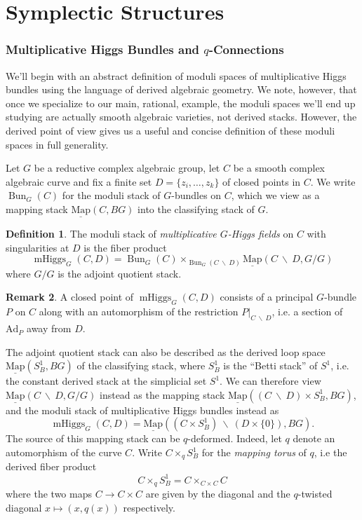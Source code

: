 \documentclass[11pt, oneside, reqno]{amsart}
\theoremstyle{definition} \newtheorem{definition}{Definition}[section]
\theoremstyle{definition} \newtheorem{remark}[definition]{Remark}
\theoremstyle{definition} \newtheorem{remarks}[definition]{Remarks}
\theoremstyle{definition} \newtheorem{question}[definition]{Question}
\theoremstyle{definition} \newtheorem*{note}{Note}
\theoremstyle{definition} \newtheorem{example}[definition]{Example}
\theoremstyle{definition} \newtheorem{examples}[definition]{Examples}
\newcommand{\mr}[1]{\mathrm{#1}}
\newcommand{\bs}{\ \backslash \ }
\newcommand{\ul}[1]{\underline{#1}}
\DeclareMathOperator{\bun}{Bun}
\DeclareMathOperator{\mhiggs}{mHiggs}
\newcommand{\map}{\ul{\mr{Map}}}
\newcommand{\Ad}{\mr{Ad}}
\begin{document}
\renewcommand{\thepart}{\Alph{part}}
\part{Symplectic Structures}

\section{Multiplicative Higgs Bundles and $q$-Connections} \label{mhiggs_def_section}
We'll begin with an abstract definition of moduli spaces of multiplicative Higgs bundles using the language of derived algebraic geometry.  We note, however, that once we specialize to our main, rational, example, the moduli spaces we'll end up studying are actually smooth algebraic varieties, not derived stacks.  However, the derived point of view gives us a useful and concise definition of these moduli spaces in full generality.

Let $G$ be a reductive complex algebraic group, let $C$ be a smooth complex algebraic curve and fix a finite set $D = \{z_i, \ldots, z_k\}$ of closed points in $C$.  We write $\bun_G(C)$ for the moduli stack of $G$-bundles on $C$, which we view as a mapping stack $\map(C, BG)$ into the classifying stack of $G$.

\begin{definition}
The moduli stack of \emph{multiplicative $G$-Higgs fields} on $C$ with singularities at $D$ is the fiber product
\[\mhiggs_G(C,D) = \bun_G(C) \times_{\bun_G(C \! \bs \! D)} \map(C \! \bs \! D, G/G)\]
where $G/G$ is the adjoint quotient stack.
\end{definition}

\begin{remark}
A closed point of $\mhiggs_G(C,D)$ consists of a principal $G$-bundle $P$ on $C$ along with an automorphism of the restriction $P|_{C \! \bs \! D}$, i.e. a section of $\Ad_P$ away from $D$.
\end{remark}

The adjoint quotient stack can also be described as the derived loop space $\map(S^1_B, BG)$ of the classifying stack, where $S^1_B$ is the ``Betti stack'' of $S^1$, i.e. the constant derived stack at the simplicial set $S^1$.  We can therefore view $\map(C \! \bs \! D, G/G)$ instead as the mapping stack $\map((C \! \bs \! D) \times S^1_B, BG)$, and the moduli stack of multiplicative Higgs bundles instead as
\[\mhiggs_G(C,D) = \map((C \times S^1_B) \bs (D \times \{0\}), BG).\]  
The source of this mapping stack can be $q$-deformed.  Indeed, let $q$ denote an automorphism of the curve $C$.  Write $C \times_q S^1_B$ for the \emph{mapping torus} of $q$, i.e the derived fiber product
\[C \times_q S^1_B = C \times_{C \times C} C\]
where the two maps $C \to C \times C$ are given by the diagonal and the $q$-twisted diagonal $x \mapsto (x,q(x))$ respectively.
\end{document}

